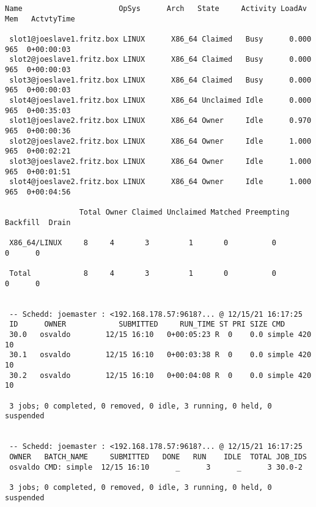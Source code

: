 \begin{lstlisting}[style=output_tiny]
 Name                      OpSys      Arch   State     Activity LoadAv Mem   ActvtyTime
 
 slot1@joeslave1.fritz.box LINUX      X86_64 Claimed   Busy      0.000  965  0+00:00:03
 slot2@joeslave1.fritz.box LINUX      X86_64 Claimed   Busy      0.000  965  0+00:00:03
 slot3@joeslave1.fritz.box LINUX      X86_64 Claimed   Busy      0.000  965  0+00:00:03
 slot4@joeslave1.fritz.box LINUX      X86_64 Unclaimed Idle      0.000  965  0+00:35:03
 slot1@joeslave2.fritz.box LINUX      X86_64 Owner     Idle      0.970  965  0+00:00:36
 slot2@joeslave2.fritz.box LINUX      X86_64 Owner     Idle      1.000  965  0+00:02:21
 slot3@joeslave2.fritz.box LINUX      X86_64 Owner     Idle      1.000  965  0+00:01:51
 slot4@joeslave2.fritz.box LINUX      X86_64 Owner     Idle      1.000  965  0+00:04:56
 
                 Total Owner Claimed Unclaimed Matched Preempting Backfill  Drain
 
 X86_64/LINUX     8     4       3         1       0          0        0      0
 
 Total            8     4       3         1       0          0        0      0
 
 
 -- Schedd: joemaster : <192.168.178.57:9618?... @ 12/15/21 16:17:25
 ID      OWNER            SUBMITTED     RUN_TIME ST PRI SIZE CMD
 30.0   osvaldo        12/15 16:10   0+00:05:23 R  0    0.0 simple 420 10
 30.1   osvaldo        12/15 16:10   0+00:03:38 R  0    0.0 simple 420 10
 30.2   osvaldo        12/15 16:10   0+00:04:08 R  0    0.0 simple 420 10
 
 3 jobs; 0 completed, 0 removed, 0 idle, 3 running, 0 held, 0 suspended
 
 
 -- Schedd: joemaster : <192.168.178.57:9618?... @ 12/15/21 16:17:25
 OWNER   BATCH_NAME     SUBMITTED   DONE   RUN    IDLE  TOTAL JOB_IDS
 osvaldo CMD: simple  12/15 16:10      _      3      _      3 30.0-2
 
 3 jobs; 0 completed, 0 removed, 0 idle, 3 running, 0 held, 0 suspended

 
\end{lstlisting}